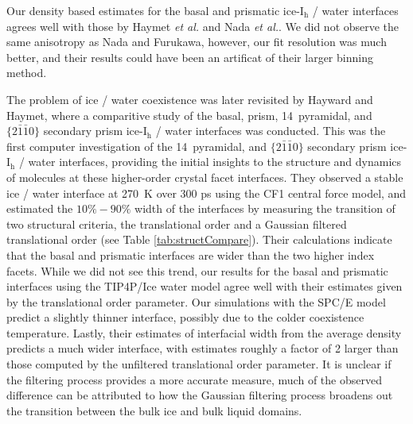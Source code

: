 Our density based estimates for the basal and prismatic
ice-I$_\mathrm{h}$ / water interfaces agrees well with those by Haymet
\textit{et al.} and Nada \textit{et al.}. We did not observe the same
anisotropy as Nada and Furukawa, however, our fit resolution was much
better, and their results could have been an artificat of their larger
binning method.

The problem of ice / water coexistence was later revisited by Hayward
and Haymet, where a comparitive study of the basal, prism,
14\degree~pyramidal, and $\{2\bar{1}\bar{1}0\}$ secondary prism
ice-I$_\mathrm{h}$ / water interfaces was conducted.\cite{Hayward2001}
This was the first computer investigation of the 14\degree~pyramidal,
and $\{2\bar{1}\bar{1}0\}$ secondary prism ice-I$_\mathrm{h}$ / water
interfaces, providing the initial insights to the structure and
dynamics of molecules at these higher-order crystal facet interfaces.
They observed a stable ice / water interface at 270~K over 300 ps
using the CF1 central force model, and estimated the $10\%-90\%$ width
of the interfaces by measuring the transition of two structural
criteria, the translational order and a Gaussian filtered
translational order (see Table \ref{tab:structCompare}). Their
calculations indicate that the basal and prismatic interfaces are
wider than the two higher index facets. While we did not see this
trend, our results for the basal and prismatic interfaces using the
TIP4P/Ice water model agree well with their estimates given by the
translational order parameter. Our simulations with the SPC/E model
predict a slightly thinner interface, possibly due to the colder
coexistence temperature. Lastly, their estimates of interfacial width
from the average density predicts a much wider interface, with
estimates roughly a factor of 2 larger than those computed by the
unfiltered translational order parameter. It is unclear if the
filtering process provides a more accurate measure, much of the
observed difference can be attributed to how the Gaussian filtering
process broadens out the transition between the bulk ice and bulk
liquid domains.
 

